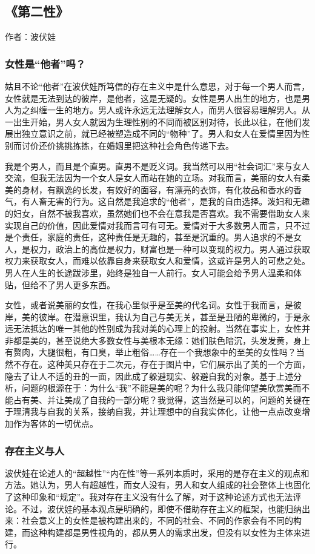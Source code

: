 \subsection{《第二性》}

作者：波伏娃

\subsubsection{女性是“他者”吗？}
姑且不论“他者”在波伏娃所笃信的存在主义中是什么意思，对于每一个男人而言，女性就是无法到达的彼岸，是他者，这是无疑的。女性是男人出生的地方，也是男人为之纠缠一生的地方。男人或许永远无法理解女人，而男人很容易理解男人。从一出生开始，男人女人就因为生理性别的不同而被区别对待，长此以往，在他们发展出独立意识之前，就已经被塑造成不同的“物种”了。男人和女人在爱情里因为性别而讨价还价挑挑拣拣，在婚姻里把这种社会角色传递下去。

我是个男人，而且是个直男。直男不是贬义词。我当然可以用“社会词汇”来与女人交流，但我无法因为一个女人是女人而站在她的立场。对我而言，美丽的女人有柔美的身材，有飘逸的长发，有姣好的面容，有漂亮的衣饰，有化妆品和香水的香气，有人畜无害的行为。这自然是我追求的“他者”，是我的自由选择。泼妇和无趣的妇女，自然不被我喜欢，虽然她们也不会在意我是否喜欢。我不需要借助女人来实现自己的价值，因此爱情对我而言可有可无。爱情对于大多数男人而言，只不过是个责任，家庭的责任，这种责任是无趣的，甚至是沉重的。男人追求的不是女人，是权力，政治上的高位是权力，财富也是一种可以变现的权力。男人通过获取权力来获取女人，而难以依靠自身来获取女人和爱情，这或许是男人的可悲之处。男人在人生的长途跋涉里，始终是独自一人前行。女人可能会给予男人温柔和体贴，但给不了男人更多东西。

女性，或者说美丽的女性，在我心里似乎是至美的代名词。女性于我而言，是彼岸，美的彼岸。在潜意识里，我认为自己与美无关，甚至是丑陋的卑微的，于是永远无法抵达的唯一其他的性别成为我对美的心理上的投射。当然在事实上，女性并非都是美的，甚至说绝大多数女性与美根本无缘：她们肤色暗沉，头发发黄，身上有赘肉，大腿很粗，有口臭，举止粗俗……存在一个我想象中的至美的女性吗？当然不存在。这种美只存在于二次元，存在于图片中，它们展示出了美的一个方面，隐去了让人不适的丑的一面，因此成了躲避现实、躲避自我的对象。基于上述分析，问题的根源在于：为什么“我”不能是美的呢？为什么我只能仰望美欣赏美而不能占有美、并让美成了自我的一部分呢？我觉得，这当然是可以的，问题的关键在于理清我与自我的关系，接纳自我，并让理想中的自我实体化，让他一点点改变增加作为客体的一切优点。

\subsubsection{存在主义与人}
波伏娃在论述人的“超越性”“内在性”等一系列本质时，采用的是存在主义的观点和方法。她认为，男人有超越性，而女人没有，男人和女人组成的社会整体上也固化了这种印象和“规定”。我对存在主义没有什么了解，对于这种论述方式也无法评论。不过，波伏娃的基本观点是明确的，即使不借助存在主义的框架，也能归纳出来：社会意义上的女性是被构建出来的，不同的社会、不同的作家会有不同的构建，而这种构建都是男性视角的，都从男人的需求出发，但没有以女性为主体来进行。

